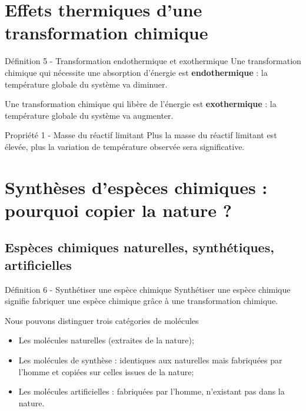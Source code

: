 \documentclass[french, a4paper, 12pt, twocolumn, landscape]{article}
\begin{document}
\section{Effets thermiques d'une transformation chimique}


\begin{definition}{Définition 5 - Transformation endothermique et exothermique}
	Une transformation chimique qui nécessite une absorption d'énergie est \textbf{endothermique} : la température globale du système va diminuer.\medskip

	Une transformation chimique qui libère de l'énergie est \textbf{exothermique} : la température globale du système va augmenter.
\end{definition}

\begin{proposition}{Propriété 1 - Masse du réactif limitant}
	Plus la masse du réactif limitant est élevée, plus la variation de température observée sera significative.
\end{proposition}


\section{Synthèses d'espèces chimiques : pourquoi copier la nature ?}



\subsection{Espèces chimiques naturelles, synthétiques, artificielles}
\begin{definition}{Définition 6 - Synthétiser une espèce chimique}
	Synthétiser une espèce chimique signifie fabriquer une espèce chimique grâce à une transformation chimique.
\end{definition}

Nous pouvons distinguer trois catégories de molécules
\begin{itemize}
	\item Les molécules naturelles (extraites de la nature);
	\item Les molécules de synthèse  : identiques aux naturelles mais fabriquées par l'homme et copiées sur celles issues de la nature;
	\item Les molécules artificielles : fabriquées par l'homme, n'existant pas dans la nature.
\end{itemize}
\end{document}
